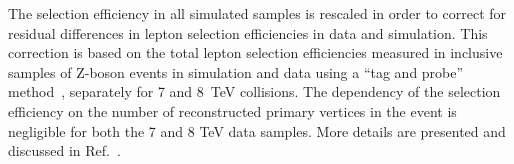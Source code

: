 The selection efficiency in all simulated samples is rescaled in order to correct for residual differences in lepton selection efficiencies in data and 
simulation. This correction is based on the total lepton selection efficiencies measured in inclusive samples of Z-boson events in simulation and data 
using a ``tag and probe'' method~\cite{CMS:2011lsa}, separately for 7 and 8~TeV collisions.
The dependency of the selection efficiency on the number of reconstructed primary vertices in the event is negligible for both the 7 and 8 TeV data samples.
More details are presented and discussed in Ref.~\cite{Chatrchyan:2013mxa}.


%
\begin{table}[htb]
%
  \begin{center}
  \vspace*{0.3cm}


\end{center}
\end{table}
